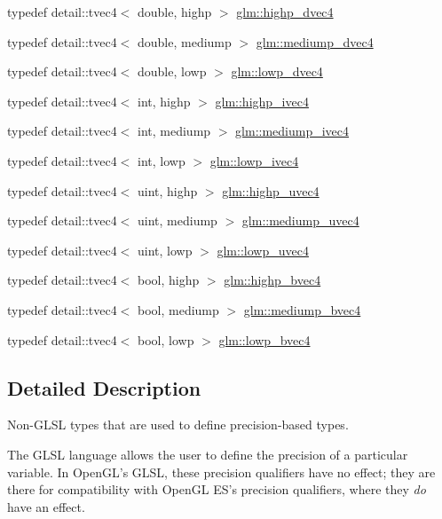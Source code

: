 \begin{CompactItemize}
\item 
typedef detail::tvec4$<$ double, highp $>$ \hyperlink{group__core__precision_gd5ff5ff4a69e6925f5b4f540e2633835}{glm::highp\_\-dvec4}
\item 
typedef detail::tvec4$<$ double, mediump $>$ \hyperlink{group__core__precision_gc61cf2fc2df895e5f277c978dace042a}{glm::mediump\_\-dvec4}
\item 
typedef detail::tvec4$<$ double, lowp $>$ \hyperlink{group__core__precision_gd04432e5d5accf764e10c6674e5d0c96}{glm::lowp\_\-dvec4}
\item 
typedef detail::tvec4$<$ int, highp $>$ \hyperlink{group__core__precision_geba08fcf78aeae954c3335d73500ff8b}{glm::highp\_\-ivec4}
\item 
typedef detail::tvec4$<$ int, mediump $>$ \hyperlink{group__core__precision_ga4c23a132d76436e041747b0c03265ad}{glm::mediump\_\-ivec4}
\item 
typedef detail::tvec4$<$ int, lowp $>$ \hyperlink{group__core__precision_gb9b404ae623385d5094499d2d4e4616d}{glm::lowp\_\-ivec4}
\item 
typedef detail::tvec4$<$ uint, highp $>$ \hyperlink{group__core__precision_g7cb8cc501f7e680e1889b93eb80e6c46}{glm::highp\_\-uvec4}
\item 
typedef detail::tvec4$<$ uint, mediump $>$ \hyperlink{group__core__precision_gd90c29c2643136a9bcb1165eac47c810}{glm::mediump\_\-uvec4}
\item 
typedef detail::tvec4$<$ uint, lowp $>$ \hyperlink{group__core__precision_g17b5f652e5c64b0034065420d844fca7}{glm::lowp\_\-uvec4}
\item 
typedef detail::tvec4$<$ bool, highp $>$ \hyperlink{group__core__precision_g381539af52c5e5c659700e12fb706eaf}{glm::highp\_\-bvec4}
\item 
typedef detail::tvec4$<$ bool, mediump $>$ \hyperlink{group__core__precision_g8bb7cfe902e2cb356450d211ca4d58e2}{glm::mediump\_\-bvec4}
\item 
typedef detail::tvec4$<$ bool, lowp $>$ \hyperlink{group__core__precision_g24c651dc8cb20779b3773428aef4f7f4}{glm::lowp\_\-bvec4}
\end{CompactItemize}


\subsection{Detailed Description}
Non-GLSL types that are used to define precision-based types. 

The GLSL language allows the user to define the precision of a particular variable. In OpenGL's GLSL, these precision qualifiers have no effect; they are there for compatibility with OpenGL ES's precision qualifiers, where they {\em do\/} have an effect.

